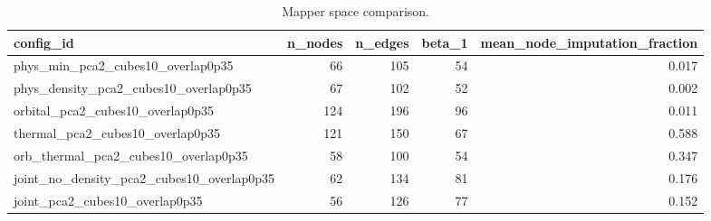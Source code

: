 \begin{table}
\caption{Mapper space comparison.}
\label{tab:mapper_space_comparison}
\begin{tabular}{lrrrr}
\toprule
config\_id & n\_nodes & n\_edges & beta\_1 & mean\_node\_imputation\_fraction \\
\midrule
phys\_min\_pca2\_cubes10\_overlap0p35 & 66 & 105 & 54 & 0.017 \\
phys\_density\_pca2\_cubes10\_overlap0p35 & 67 & 102 & 52 & 0.002 \\
orbital\_pca2\_cubes10\_overlap0p35 & 124 & 196 & 96 & 0.011 \\
thermal\_pca2\_cubes10\_overlap0p35 & 121 & 150 & 67 & 0.588 \\
orb\_thermal\_pca2\_cubes10\_overlap0p35 & 58 & 100 & 54 & 0.347 \\
joint\_no\_density\_pca2\_cubes10\_overlap0p35 & 62 & 134 & 81 & 0.176 \\
joint\_pca2\_cubes10\_overlap0p35 & 56 & 126 & 77 & 0.152 \\
\bottomrule
\end{tabular}
\end{table}
